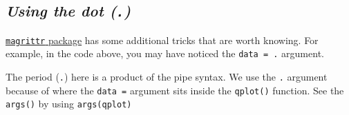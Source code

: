\documentclass[letterpaper,12pt,twoside,]{pinp}
\begin{document}
\hypertarget{using-the-dot-.}{%
\subsection{\texorpdfstring{\textbf{\emph{Using the dot
(\texttt{.})}}}{Using the dot (.)}}\label{using-the-dot-.}}

\href{https://magrittr.tidyverse.org/}{\texttt{magrittr} package} has
some additional tricks that are worth knowing. For example, in the code
above, you may have noticed the \texttt{data\ =\ .} argument.

\begin{Shaded}
\begin{Highlighting}[]
\SpecialCharTok{\%\textgreater{}\%} 
\SpecialCharTok{::}\NormalTok{(}
                  \NormalTok{)}
\end{Highlighting}
\end{Shaded}

The period (\texttt{.}) here is a product of the pipe syntax. We use the
\texttt{.} argument because of where the \texttt{data\ =} argument sits
inside the \texttt{qplot()} function. See the \texttt{args()} by using
\texttt{args(qplot)}

\begin{Shaded}
\begin{Highlighting}[]
\end{Highlighting}
\end{Shaded}

\begin{Shaded}
\begin{Highlighting}[]
         \NormalTok{, }
         \NormalTok{, }
         \NormalTok{, }
         \NormalTok{(}\NormalTok{, }\NormalTok{), }
         \NormalTok{(}\NormalTok{, }\NormalTok{), }
         \NormalTok{, }
         \NormalTok{, }
         \NormalTok{, }
         \NormalTok{, }
         \NormalTok{, }
         \NormalTok{, }
         \NormalTok{) }
\end{Highlighting}
\end{Shaded}
\end{document}
